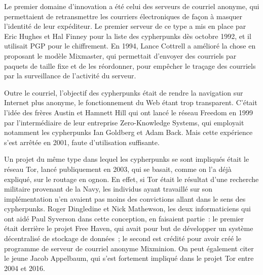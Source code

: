 Le premier domaine d'innovation a été celui des serveurs de courriel anonyme, qui permettaient de retransmettre les courriers électroniques de façon à masquer l'identité de leur expéditeur. Le premier serveur de ce type a mis en place par Eric Hughes et Hal Finney pour la liste des cypherpunks dès octobre 1992, et il utilisait PGP pour le chiffrement. En 1994, Lance Cottrell a amélioré la chose en proposant le modèle Mixmaster, qui permettait d'envoyer des courriels par paquets de taille fixe et de les réordonner, pour empêcher le traçage des courriels par la surveillance de l'activité du serveur. %

Outre le courriel, l'objectif des cypherpunks était de rendre la navigation sur Internet plus anonyme, le fonctionnement du Web étant trop transparent. C'était l'idée des frères Austin et Hamnett Hill qui ont lancé le réseau Freedom en 1999 par l'intermédiaire de leur entreprise Zero-Knowledge Systems, qui employait notamment les cypherpunks Ian Goldberg et Adam Back. Mais cette expérience s'est arrêtée en 2001, faute d'utilisation suffisante.

Un projet du même type dans lequel les cypherpunks se sont impliqués était le réseau Tor, lancé publiquement en 2003, qui se basait, comme on l'a déjà expliqué, sur le routage en ognon. En effet, si Tor était le résultat d'une recherche militaire provenant de la Navy, les individus ayant travaillé sur son implémentation n'en avaient pas moins des convictions allant dans le sens des cypherpunks. Roger Dingledine et Nick Mathewson, les deux informaticiens qui ont aidé Paul Syverson dans cette conception, en faisaient partie~: le premier était derrière le projet Free Haven, qui avait pour but de développer un système décentralisé de stockage de données~; le second est crédité pour avoir créé le programme de serveur de courriel anonyme Mixminion. On peut également citer le jeune Jacob Appelbaum, qui s'est fortement impliqué dans le projet Tor entre 2004 et 2016.

